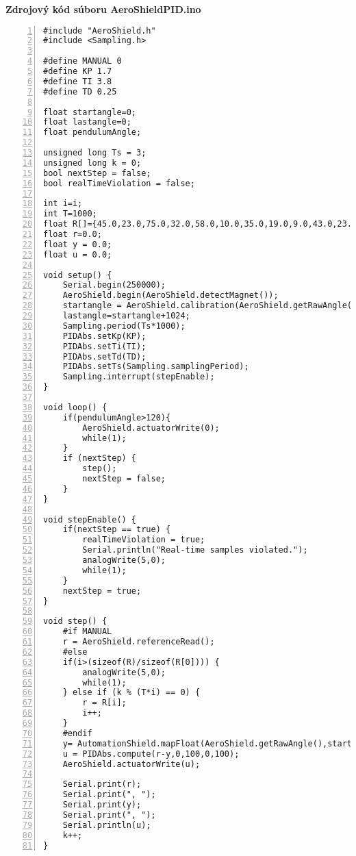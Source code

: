 \LARGE\bf{Zdrojový kód súboru AeroShieldPID.ino}
\label{AeroShieldPID.ino}
\vspace{1cm}
\begin{lstlisting}[numbers=left,basicstyle=\scriptsize,caption={Zdrojový kód súboru AeroShieldPID.ino.},captionpos=b]	
#include "AeroShield.h"              
#include <Sampling.h>   

#define MANUAL 0    
#define KP 1.7  
#define TI 3.8  
#define TD 0.25   

float startangle=0; 
float lastangle=0; 
float pendulumAngle;

unsigned long Ts = 3; 
unsigned long k = 0; 
bool nextStep = false;  
bool realTimeViolation = false;

int i=i;          
int T=1000;           
float R[]={45.0,23.0,75.0,32.0,58.0,10.0,35.0,19.0,9.0,43.0,23.0,65.0,15.0,80.0}; 
float r=0.0;          
float y = 0.0;        
float u = 0.0;         

void setup() {           
	Serial.begin(250000);                         
	AeroShield.begin(AeroShield.detectMagnet());
	startangle = AeroShield.calibration(AeroShield.getRawAngle()); 
	lastangle=startangle+1024;                                  
	Sampling.period(Ts*1000);      
	PIDAbs.setKp(KP);       
	PIDAbs.setTi(TI);    
	PIDAbs.setTd(TD);     
	PIDAbs.setTs(Sampling.samplingPeriod); 
	Sampling.interrupt(stepEnable); 
}

void loop() {
	if(pendulumAngle>120){
		AeroShield.actuatorWrite(0);
		while(1);
	} 
	if (nextStep) {    
		step();          
		nextStep = false;  
	}
}

void stepEnable() {             
	if(nextStep == true) {         
		realTimeViolation = true;   
		Serial.println("Real-time samples violated."); 
		analogWrite(5,0);  
		while(1);    
	}
	nextStep = true; 
}

void step() {  
	#if MANUAL                       
	r = AeroShield.referenceRead(); 
	#else        
	if(i>(sizeof(R)/sizeof(R[0]))) {  
		analogWrite(5,0); 
		while(1); 
	} else if (k % (T*i) == 0) {
		r = R[i];
		i++; 
	}
	#endif
	y= AutomationShield.mapFloat(AeroShield.getRawAngle(),startangle,lastangle,0.00,100.00);
	u = PIDAbs.compute(r-y,0,100,0,100);
	AeroShield.actuatorWrite(u);
	
	Serial.print(r);
	Serial.print(", ");
	Serial.print(y); 
	Serial.print(", ");
	Serial.println(u); 
	k++; 
}
\end{lstlisting}